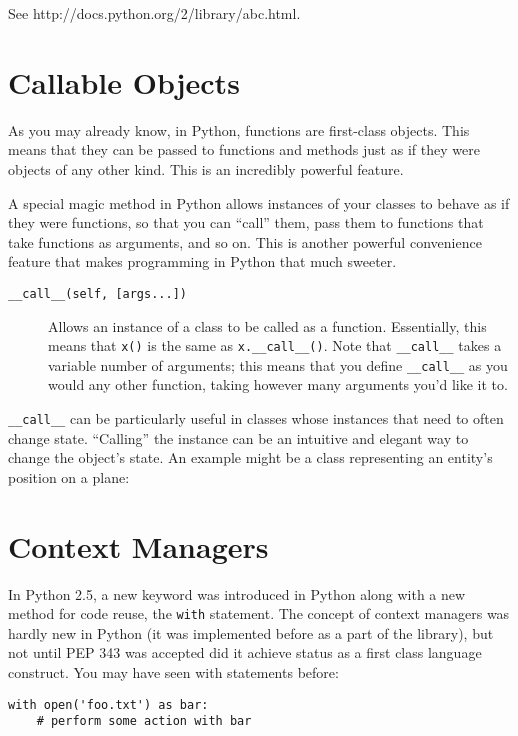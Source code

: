 \documentclass[a4paper,11pt]{article}
\newcommand{\code}[1]{\texttt{#1}}
\begin{document}
See http://docs.python.org/2/library/abc.html.

\section{Callable Objects}

As you may already know, in Python, functions are first-class objects. This means that they can be passed to functions and methods just as if they were objects of any other kind. This is an incredibly powerful feature.

A special magic method in Python allows instances of your classes to behave as if they were functions, so that you can ``call'' them, pass them to functions that take functions as arguments, and so on. This is another powerful convenience feature that makes programming in Python that much sweeter.

\begin{description}

\item[\code{__call__(self, [args...])}]
Allows an instance of a class to be called as a function. Essentially, this means that \code{x()} is the same as \code{x.__call__()}. Note that \code{__call__} takes a variable number of arguments; this means that you define \code{__call__} as you would any other function, taking however many arguments you'd like it to.

\end{description}

\code{__call__} can be particularly useful in classes whose instances that need to often change state. ``Calling'' the instance can be an intuitive and elegant way to change the object's state. An example might be a class representing an entity's position on a plane:



\section{Context Managers}

In Python 2.5, a new keyword was introduced in Python along with a new method for code reuse, the \code{with} statement. The concept of context managers was hardly new in Python (it was implemented before as a part of the library), but not until PEP 343 was accepted did it achieve status as a first class language construct. You may have seen with statements before:

\begin{lstlisting}   
with open('foo.txt') as bar:
    # perform some action with bar
\end{lstlisting}
        
\end{document}
